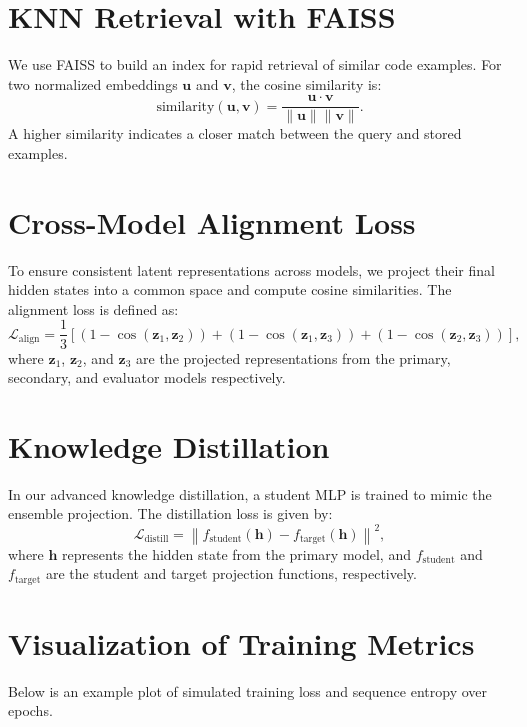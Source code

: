 \documentclass[11pt]{article}
\begin{document}
\section{KNN Retrieval with FAISS}
We use FAISS to build an index for rapid retrieval of similar code examples. For two normalized embeddings $\mathbf{u}$ and $\mathbf{v}$, the cosine similarity is:
\begin{equation}
    \text{similarity}(\mathbf{u}, \mathbf{v}) = \frac{\mathbf{u} \cdot \mathbf{v}}{\|\mathbf{u}\| \|\mathbf{v}\|}.
\end{equation}
A higher similarity indicates a closer match between the query and stored examples.

\section{Cross-Model Alignment Loss}
To ensure consistent latent representations across models, we project their final hidden states into a common space and compute cosine similarities. The alignment loss is defined as:
\begin{equation}
    \mathcal{L}_{\text{align}} = \frac{1}{3} \left[ (1 - \cos(\mathbf{z}_1, \mathbf{z}_2)) + (1 - \cos(\mathbf{z}_1, \mathbf{z}_3)) + (1 - \cos(\mathbf{z}_2, \mathbf{z}_3)) \right],
\end{equation}
where $\mathbf{z}_1$, $\mathbf{z}_2$, and $\mathbf{z}_3$ are the projected representations from the primary, secondary, and evaluator models respectively.

\section{Knowledge Distillation}
In our advanced knowledge distillation, a student MLP is trained to mimic the ensemble projection. The distillation loss is given by:
\begin{equation}
    \mathcal{L}_{\text{distill}} = \left\| f_{\text{student}}(\mathbf{h}) - f_{\text{target}}(\mathbf{h}) \right\|^2,
\end{equation}
where $\mathbf{h}$ represents the hidden state from the primary model, and $f_{\text{student}}$ and $f_{\text{target}}$ are the student and target projection functions, respectively.

\section{Visualization of Training Metrics}
Below is an example plot of simulated training loss and sequence entropy over epochs.
\end{document}

